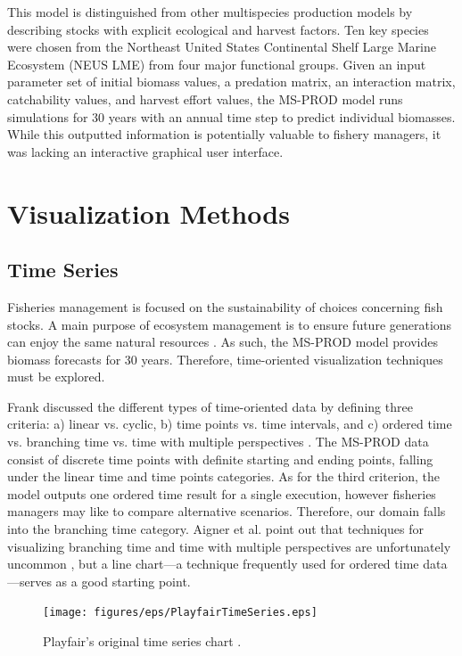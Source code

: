 This model is distinguished from other multispecies production models by describing stocks with explicit ecological and harvest factors.  Ten key species were chosen from the Northeast United States Continental Shelf Large Marine Ecosystem (NEUS LME) from four major functional groups.  Given an input parameter set of initial biomass values, a predation matrix, an interaction matrix, catchability values, and harvest effort values, the MS-PROD model runs simulations for 30 years with an annual time step to predict individual biomasses.  While this outputted information is potentially valuable to fishery managers, it was lacking an interactive graphical user interface.  

\section{Visualization Methods}

\subsection{Time Series}

Fisheries management is focused on the sustainability of choices concerning fish stocks.  A main purpose of ecosystem management is to ensure future generations can enjoy the same natural resources \cite{christensen1996}.  As such, the MS-PROD model provides biomass forecasts for 30 years.  Therefore, time-oriented visualization techniques must be explored.

Frank discussed the different types of time-oriented data by defining three criteria: a) linear vs. cyclic, b) time points vs. time intervals, and c) ordered time vs. branching time vs. time with multiple perspectives \cite{frank1998}.  The MS-PROD data consist of discrete time points with definite starting and ending points, falling under the linear time and time points categories.  As for the third criterion, the model outputs one ordered time result for a single execution, however fisheries managers may like to compare alternative scenarios.  Therefore, our domain falls into the branching time category.  Aigner et al. point out that techniques for visualizing branching time and time with multiple perspectives are unfortunately uncommon \cite{aigner2008}, but a line chart---a technique frequently used for ordered time data---serves as a good starting point.

\begin{figure}[h]
	\centering
	\texttt{[image: figures/eps/PlayfairTimeSeries.eps]}
	\caption{Playfair's original time series chart \cite{playfair}.}
	\label{fig:playfair}
\end{figure}

